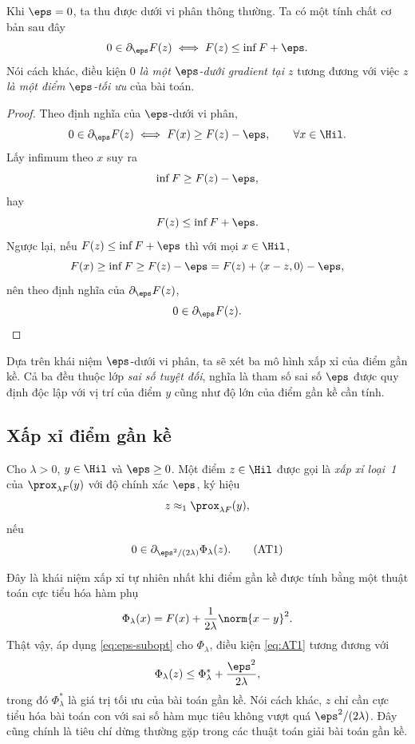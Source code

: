 Khi $\eps=0$, ta thu được dưới vi phân thông thường. Ta có một tính chất cơ bản sau đây
\begin{equation}
  0\in\partial_\eps F(z)
  \iff
  F(z)\le\inf F+\eps.
  \label{eq:eps-subopt}
\end{equation}
Nói cách khác, điều kiện \textit{$0$ là một $\eps$-dưới gradient tại $z$} tương đương với việc \textit{$z$ là một điểm $\eps$-tối ưu} của bài toán. 
\begin{proof}
Theo định nghĩa của $\eps$-dưới vi phân,
\[
0\in\partial_\eps F(z)
\iff
F(x)\ge F(z)-\eps,\qquad\forall x\in\Hil.
\]
Lấy infimum theo $x$ suy ra
\[
\inf F\ge F(z)-\eps,
\]
hay 
\[
F(z)\le\inf F+\eps.
\]
Ngược lại, nếu $F(z)\le\inf F+\eps$ thì với mọi $x\in\Hil$,
\[
F(x)\ge\inf F\ge F(z)-\eps
=
F(z)+\langle x-z,0\rangle-\eps,
\]
nên theo định nghĩa của $\partial_\eps F(z)$,
\[
0\in\partial_\eps F(z).
\]
\end{proof}

Dựa trên khái niệm $\eps$-dưới vi phân, ta sẽ xét ba mô hình xấp xỉ của điểm gần kề. Cả ba đều thuộc lớp \emph{sai số tuyệt đối}, nghĩa là tham số sai số $\eps$ được quy định độc lập với vị trí của điểm $y$ cũng như độ lớn của điểm gần kề cần tính.

\subsection{Xấp xỉ điểm gần kề}
\begin{definition}
Cho $\lambda>0$, $y\in\Hil$ và $\eps\ge0$. Một điểm
$z\in\Hil$ được gọi là \emph{xấp xỉ loại~1} của
$\prox_{\lambda F}(y)$ với độ chính xác $\eps$, ký hiệu
\[
z\approx_1\prox_{\lambda F}(y),
\]
nếu
\begin{equation}
0\in\partial_{\eps^2/(2\lambda)}\Phi_\lambda(z).
\tag{AT1}
\label{eq:AT1}
\end{equation}
\end{definition}

Đây là khái niệm xấp xỉ tự nhiên nhất khi điểm gần kề được tính bằng một
thuật toán cực tiểu hóa hàm phụ
\[
\Phi_\lambda(x)
=
F(x)+\frac1{2\lambda}\norm{x-y}^2.
\]
Thật vậy, áp dụng \eqref{eq:eps-subopt} cho $\Phi_\lambda$, điều kiện
\eqref{eq:AT1} tương đương với
\[
\Phi_\lambda(z)
\le
\Phi_\lambda^*
+
\frac{\eps^2}{2\lambda},
\]
trong đó $\Phi_\lambda^*$ là giá trị tối ưu của bài toán gần kề. Nói cách
khác, $z$ chỉ cần cực tiểu hóa bài toán con với sai số hàm mục tiêu không
vượt quá $\eps^2/(2\lambda)$. Đây cũng chính là tiêu chí dừng thường gặp
trong các thuật toán giải bài toán gần kề.

